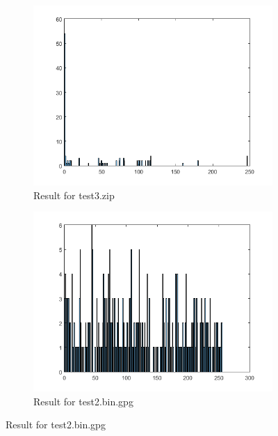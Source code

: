 \documentclass[oneside,a4paper,12pt]{report}
\begin{document}
\begin{figure}
\begin{subfigure}{0.5\textwidth}
\includegraphics[scale=0.5]{test3.png}
\caption{Result for test3.zip}
\end{subfigure}
\begin{subfigure}{0.5\textwidth}
\includegraphics[scale=0.5]{test4.png}
\caption{Result for test2.bin.gpg}
\end{subfigure}
\end{figure}
\end{document}
